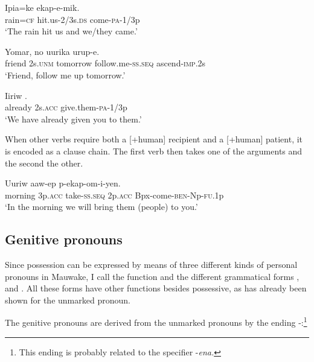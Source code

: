 \ea%
\label{ex:3:x564}
\gll Ipia=ke  ekap-e-mik. \\
rain=\textsc{cf} hit.us-2/3s.\textsc{ds} come-\textsc{pa}-1/3p\\
\glt`The rain hit us and we/they came.'
\z

\ea%
\label{ex:3:x1526}
\gll Yomar, no uurika \textstyleEmphasizedVernacularWords{-} urup-e. \\
friend 2s.\textsc{unm} tomorrow follow.me-\textsc{ss}.\textsc{seq} ascend-\textsc{imp}.2s\\
\glt`Friend, follow me up tomorrow.'
\z

\ea%
\label{ex:3:x565}
\gll Iiriw  . \\
already 2s.\textsc{acc} give.them-\textsc{pa}-1/3p\\
\glt`We have already given you to them.'
\z

When other verbs require both a [+human] recipient and a [+human] patient, it is encoded as a clause chain. The first verb then takes one of the arguments and the second the other.

\ea%
\label{ex:3:x566}
\gll Uuriw  aaw-ep  p-ekap-om-i-yen. \\
morning 3p.\textsc{acc} take-\textsc{ss}.\textsc{seq} 2p.\textsc{acc} Bpx-come-\textsc{ben}-Np-\textsc{fu}.1p\\
\glt`In the morning we will bring them (people) to you.'
\z

\subsection{Genitive pronouns}\label{sec:3.5.4}
{}
Since possession can be expressed by means of three different kinds of personal pronouns in Mauwake, I call the function  and the different grammatical forms , \textstyleDefinedWords{} and . All these forms have other functions besides possessive, as has already been shown for the unmarked pronoun. 

The genitive pronouns are derived from the unmarked pronouns by the ending \nobreakdash-:\footnote{This ending is probably related to the specifier -\textit{ena.}}

